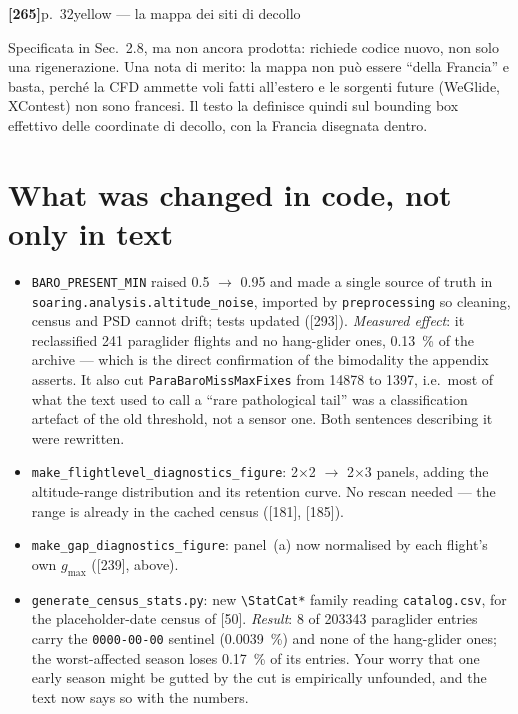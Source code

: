 \documentclass[11pt,a4paper]{article}
\newcommand{\ann}[3]{%
  \medskip\noindent\textbf{[#1]}\quad p.~#2\quad\textcolor{qcol}{\textsf{\small #3}}\par\nopagebreak}
\begin{document}
\ann{265}{32}{yellow --- la mappa dei siti di decollo}
Specificata in Sec.~2.8, ma non ancora prodotta: richiede codice nuovo, non solo una
rigenerazione. Una nota di merito: la mappa non può essere \enquote{della Francia} e basta,
perché la CFD ammette voli fatti all'estero e le sorgenti future (WeGlide, XContest) non
sono francesi. Il testo la definisce quindi sul bounding box effettivo delle coordinate di
decollo, con la Francia disegnata dentro.

\section{What was changed in code, not only in text}

\begin{itemize}[leftmargin=1.3em, itemsep=0.3em]
  \item \texttt{BARO\_PRESENT\_MIN} raised \num{0.5} $\to$ \num{0.95} and made a single
    source of truth in \texttt{soaring.analysis.altitude\_noise}, imported by
    \texttt{preprocessing} so cleaning, census and PSD cannot drift; tests updated ([293]).
    \emph{Measured effect}: it reclassified \num{241} paraglider flights and no
    hang-glider ones, \SI{0.13}{\percent} of the archive --- which is the direct
    confirmation of the bimodality the appendix asserts. It also cut
    \texttt{ParaBaroMissMaxFixes} from \num{14878} to \num{1397}, i.e.\ most of what the
    text used to call a \enquote{rare pathological tail} was a classification artefact of
    the old threshold, not a sensor one. Both sentences describing it were rewritten.
  \item \texttt{make\_flightlevel\_diagnostics\_figure}: 2$\times$2 $\to$ 2$\times$3 panels,
    adding the altitude-range distribution and its retention curve. No rescan needed --- the
    range is already in the cached census ([181], [185]).
  \item \texttt{make\_gap\_diagnostics\_figure}: panel~(a) now normalised by each flight's
    own $g_{\max}$ ([239], above).
  \item \texttt{generate\_census\_stats.py}: new \texttt{\textbackslash StatCat*} family
    reading \texttt{catalog.csv}, for the placeholder-date census of [50]. \emph{Result}:
    \num{8} of \num{203343} paraglider entries carry the \texttt{0000-00-00} sentinel
    (\SI{0.0039}{\percent}) and none of the hang-glider ones; the worst-affected season
    loses \SI{0.17}{\percent} of its entries. Your worry that one early season might be
    gutted by the cut is empirically unfounded, and the text now says so with the numbers.
\end{itemize}
\end{document}
